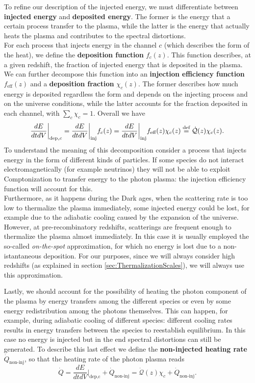 To refine our description of the injected energy, we must differentiate between \textbf{injected energy} and \textbf{deposited energy}. The former is the energy that a certain process transfer to the plasma, while the latter is the energy that actually heats the plasma and contributes to the spectral distortions.\\ For each process that injects energy in the channel $c$ (which describes the form of the heat), we define the \textbf{deposition function} $f_c(z)$. This function describes, at a given redshift, the fraction of injected energy that is deposited in the plasma. We can further decompose this function into an \textbf{injection efficiency function } $f_{\text{eff}}(z)$ and a \textbf{deposition fraction} $\chi_{c}(z)$. The former describes how much energy is deposited regardless the form and depends on the injecting process and on the universe conditions, while the latter accounts for the fraction deposited in each channel, with $\sum_c\chi_c=1$. Overall we have
\begin{equation}\label{eq:deposition_function}
    \frac{dE}{dt dV}\bigg|_{\text{dep},c}=\frac{dE}{dt dV}\bigg|_{\text{inj}}f_c(z)=\frac{dE}{dt dV}\bigg|_{\text{inj}}f_{\text{eff}}(z)\chi_c(z)\stackrel{\text{def}}{=} \dot{\mathcal{Q}}(z)\chi_c(z).
\end{equation}
To understand the meaning of this decomposition consider a process that injects energy in the form of different kinds of particles. If some species do not interact electromagnetically (for example neutrinos) they will not be able to exploit Comptonization to transfer energy to the photon plasma: the injection efficiency function will account for this.\\
Furthermore, as it happens during the Dark ages, when the scattering rate is too low to thermalize the plasma immediately, some injected energy could be lost, for example due to the adiabatic cooling caused by the expansion of the universe. However, at pre-recombinatory redshifts, scatterings are frequent enough to thermalize the plasma almost immediately. In this case it is usually employed the so-called \emph{on-the-spot} approximation, for which no energy is lost due to a non-istantaneous deposition. For our purposes, since we will always consider high redshifts (as explained in section \ref{sec:ThermalizationScales}), we will always use this approximation.

Lastly, we should account for the possibility of heating the photon component of the plasma by energy transfers among the different species or even by some energy redistribution among the photons themselves. This can happen, for example, during adiabatic cooling of different species: different cooling rates results in energy transfers between the species to reestablish equilibrium.   In this case no energy is injected but in the end spectral distortions can still be generated. To describe this last effect we define the \textbf{non-injected heating rate} $\dot{Q}_\text{non-inj}$, so that the heating rate of the photon plasma reads
\begin{equation}
    \dot{Q}=\frac{dE}{dtdV}\bigg|_{\text{dep,c}}+\dot{Q}_\text{non-inj}=\dot{\mathcal{Q}}(z)\chi_c+\dot{Q}_\text{non-inj}.\label{eq:heating_rate}
\end{equation}

